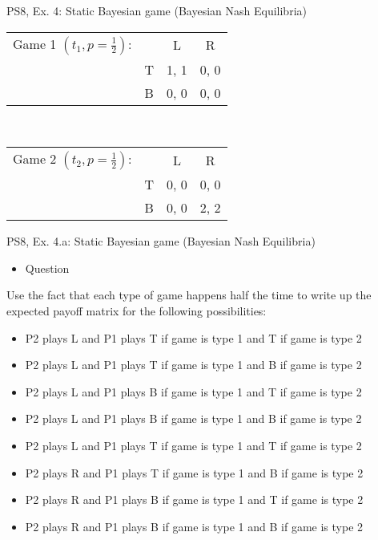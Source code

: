 \begin{frame}{PS8, Ex. 4: Static Bayesian game (Bayesian Nash Equilibria)}
    \begin{table}
      \begin{tabular}{ll|c|c|}
        \multicolumn{1}{c}{Game 1 $\left(t_1, p=\frac{1}{2}\right)$:} & \multicolumn{1}{c}{} & \multicolumn{1}{c}{L} & \multicolumn{1}{c}{R} \\\cline{3-4}
        & T & 1, 1 & 0, 0 \\\cline{3-4}
        & B & 0, 0 & 0, 0 \\\cline{3-4}
      \end{tabular}
      \\
      \begin{tabular}{ll|c|c|}
        \multicolumn{1}{c}{Game 2 $\left(t_2, p=\frac{1}{2}\right)$:} & \multicolumn{1}{c}{} & \multicolumn{1}{c}{L} & \multicolumn{1}{c}{R} \\\cline{3-4}
        & T & 0, 0 & 0, 0 \\\cline{3-4}
        & B & 0, 0 & 2, 2 \\\cline{3-4}
      \end{tabular}
    \end{table}
    \vfill\null
\end{frame}

\begin{frame}{PS8, Ex. 4.a: Static Bayesian game (Bayesian Nash Equilibria)}
\begin{itemize}
    \item[a] Question
\end{itemize}
Use the fact that each type of game happens half the time to write up the expected payoff matrix for the following possibilities:
\begin{itemize}
    \item P2 plays L and P1 plays T if game is type 1 and T if game is type 2
    \item P2 plays L and P1 plays T if game is type 1 and B if game is type 2
    \item P2 plays L and P1 plays B if game is type 1 and T if game is type 2
    \item P2 plays L and P1 plays B if game is type 1 and B if game is type 2
    \item P2 plays L and P1 plays T if game is type 1 and T if game is type 2
    \item P2 plays R and P1 plays T if game is type 1 and B if game is type 2
    \item P2 plays R and P1 plays B if game is type 1 and T if game is type 2
    \item P2 plays R and P1 plays B if game is type 1 and B if game is type 2
\end{itemize}
    \vfill\null\null
\end{frame}

